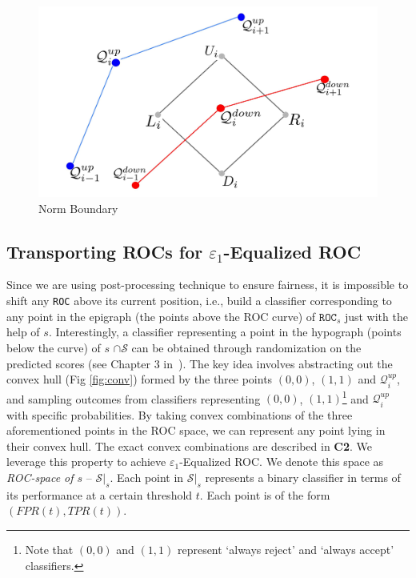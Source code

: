 \documentclass{article}
\newcommand{\ourdef}{-Equalized ROC}
\newcommand{\roc}{\texttt{ROC}_s}
\begin{document}
\begin{figure}
\begin{minipage}{0.3\linewidth}
         \centering
         \includegraphics[scale = 0.07]{diagrams/Norm_Boundary_modified_2.jpg}
         \caption{Norm Boundary}
         \label{fig:five over x}
     \end{minipage}
        \label{fig:three graphs}
\end{figure}



\subsection{Transporting ROCs for $\varepsilon_1$\ourdef} \label{ssec:ouralgo}


Since we are using post-processing technique to ensure fairness, it is impossible to shift any \texttt{ROC} above its current position, i.e., build a classifier corresponding to any point in the epigraph (the points above the ROC curve) of $\roc$ just with the help of $s$. Interestingly, a classifier representing a point in the hypograph (points below the curve) of $s$ $\cap \mathcal{S}$ can be obtained through randomization on the predicted scores (see Chapter 3 in~\cite{fairmlbook19}). The key idea involves abstracting out the convex hull (Fig \ref{fig:conv}) formed by the three points $(0,0)$, $(1,1)$ and $\mathcal{Q}_i^{up}$, and sampling outcomes from classifiers representing $(0,0)$, $(1,1)$\footnote{Note that $(0,0)$ and $(1,1)$ represent `always reject' and `always accept' classifiers.}  and $\mathcal{Q}_i^{up}$ with specific probabilities. By taking convex combinations of the three aforementioned points in the ROC space, we can represent any point lying in their convex hull. The exact convex combinations are described in \textbf{C2}. We leverage this property to achieve $\varepsilon_1$\ourdef. We denote this space as \emph{ROC-space of $s$} -- $\mathcal{S}|_s$. Each point in $\mathcal{S}|_s$ represents a binary classifier in terms of its performance at a certain threshold $t$. Each point is of the form $(FPR(t), TPR(t))$. 
\end{document}

